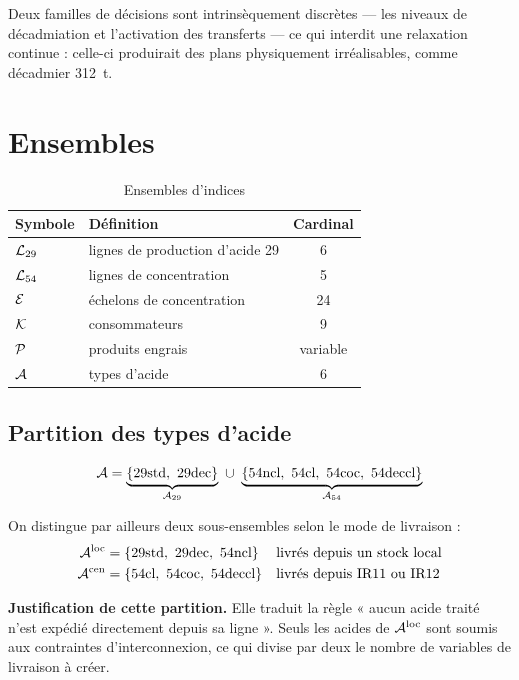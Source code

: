 Deux familles de décisions sont intrinsèquement discrètes --- les niveaux de décadmiation et
l'activation des transferts --- ce qui interdit une relaxation continue : celle-ci
produirait des plans physiquement irréalisables, comme décadmier \SI{312}{\tonne}.

\section{Ensembles}

\begin{table}[H]
\centering
\caption{Ensembles d'indices}
\label{tab:ensembles}
\begin{tabular}{@{}llc@{}}
\toprule
\textbf{Symbole} & \textbf{Définition} & \textbf{Cardinal} \\
\midrule
$\mathcal{L}_{29}$ & lignes de production d'acide 29 & 6 \\
$\mathcal{L}_{54}$ & lignes de concentration & 5 \\
$\mathcal{E}$ & échelons de concentration & 24 \\
$\mathcal{K}$ & consommateurs & 9 \\
$\mathcal{P}$ & produits engrais & variable \\
$\mathcal{A}$ & types d'acide & 6 \\
\bottomrule
\end{tabular}
\end{table}

\subsection{Partition des types d'acide}

\begin{equation}
\Acides = \underbrace{\{\text{29std},\ \text{29dec}\}}_{\Acides_{29}}
\ \cup\
\underbrace{\{\text{54ncl},\ \text{54cl},\ \text{54coc},\ \text{54deccl}\}}_{\Acides_{54}}
\end{equation}

On distingue par ailleurs deux sous-ensembles selon le mode de livraison :
\begin{align}
\Acides^{\mathrm{loc}} &= \{\text{29std},\ \text{29dec},\ \text{54ncl}\}
&&\text{livrés depuis un stock local} \\
\Acides^{\mathrm{cen}} &= \{\text{54cl},\ \text{54coc},\ \text{54deccl}\}
&&\text{livrés depuis IR11 ou IR12}
\end{align}

\begin{encadre}
\textbf{Justification de cette partition.} Elle traduit la règle « aucun acide traité n'est
expédié directement depuis sa ligne ». Seuls les acides de $\mathcal{A}^{\mathrm{loc}}$ sont
soumis aux contraintes d'interconnexion, ce qui divise par deux le nombre de variables de
livraison à créer.
\end{encadre}

